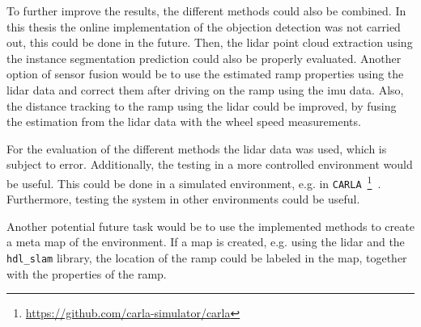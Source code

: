 To further improve the results, the different methods could also be combined.
In this thesis the online implementation of the objection detection was not carried out, this could be done in the future.
Then, the \gls{lidar} point cloud extraction using the instance segmentation prediction could also be properly evaluated.
Another option of sensor fusion would be to use the estimated ramp properties using the \gls{lidar} data and correct them after driving on the ramp using the \gls{imu} data.
Also, the distance tracking to the ramp using the \gls{lidar} could be improved, by fusing the estimation from the \gls{lidar} data with the wheel speed measurements.

For the evaluation of the different methods the \gls{lidar} data was used, which is subject to error.
Additionally, the testing in a more controlled environment would be useful.
This could be done in a simulated environment, e.g. in \texttt{CARLA}~\footnote{\url{https://github.com/carla-simulator/carla}}~\cite{Dosovitskiy2017}.
Furthermore, testing the system in other environments could be useful.

Another potential future task would be to use the implemented methods to create a meta map of the environment.
If a map is created, e.g. using the \gls{lidar} and the \texttt{hdl\_slam} library, the location of the ramp could be labeled in the map, together with the properties of the ramp.




